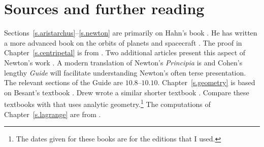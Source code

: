 
\chapter*{Sources and further reading}


Sections~\ref{s.aristarchus}--\ref{s.newton} are primarily on Hahn's book \cite{hahn-cic}. He has written a more advanced book on the orbits of planets and spacecraft \cite{hahn-orbits}. The proof in Chapter~\ref{s.centripetal} is from \cite{griffiths}. Two additional articles present this aspect of Newton's work \cite{hauser-lang,stein}. A modern translation of Newton's \emph{Principia} is \cite{newton-cohen} and Cohen's lengthy \textit{Guide} will facilitate understanding Newton's often terse presentation. The relevant sections of the Guide are $10.8$--$10.10$. Chapter~\ref{s.geometry} is based on Besant's textbook \cite{besant}. Drew wrote a similar shorter textbook \cite{drew}. Compare these textbooks with \cite{smith} that uses analytic geometry.\footnote{The dates given for these books are for the editions that I used.} The computations of Chapter~\ref{s.lagrange} are from \cite{stern}.


\begin{small}


\end{small}
